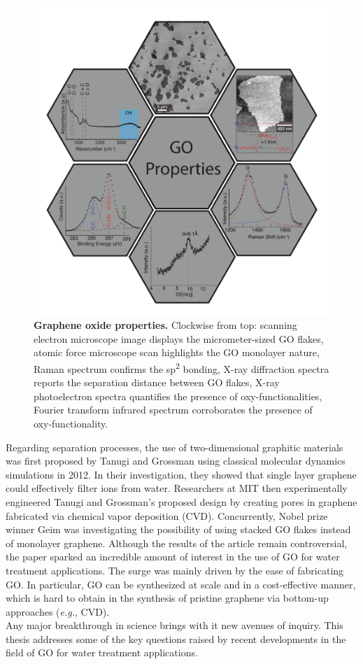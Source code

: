 \begin{figure}
  \centering
  \includegraphics[width=5.5in]{intro/Fig5.pdf}
  \caption{\textbf{Graphene oxide properties.} Clockwise from top: scanning electron microscope image displays the micrometer-sized GO flakes, atomic force microscope scan highlights the GO monolayer nature, Raman spectrum confirms the sp\textsuperscript{2} bonding, X-ray diffraction spectra reports the separation distance between GO flakes, X-ray photoelectron spectra quantifies the presence of oxy-functionalities, Fourier transform infrared spectrum corroborates the presence of oxy-functionality.}
  \label{fig5_intro}
\end{figure}

 
Regarding separation processes, the use of two-dimensional graphitic materials was first proposed by Tanugi and Grossman using classical molecular dynamics simulations in 2012.\cite{cohen2012water} In their investigation, they showed that  single layer graphene could effectively filter ions from water. Researchers at MIT then experimentally engineered Tanugi and Grossman's proposed design by creating pores in graphene fabricated via chemical vapor deposition (CVD).\cite{o2012selective} Concurrently, Nobel prize winner Geim was investigating the possibility of using stacked GO flakes instead of monolayer graphene.\cite{nair2012unimpeded} Although the results of the article remain controversial, the paper sparked an incredible amount of interest in the use of GO for water treatment applications. The surge was mainly driven by the ease of fabricating GO. In particular, GO can be synthesized at scale and in a cost-effective manner, which is hard to obtain in the synthesis of pristine graphene via bottom-up approaches (\textit{e.g.}, CVD).\cite{eletskii2011graphene}\\
Any major breakthrough in science brings with it new avenues of inquiry. This thesis addresses some of the key questions raised by recent developments in the field of GO for water treatment applications. 


